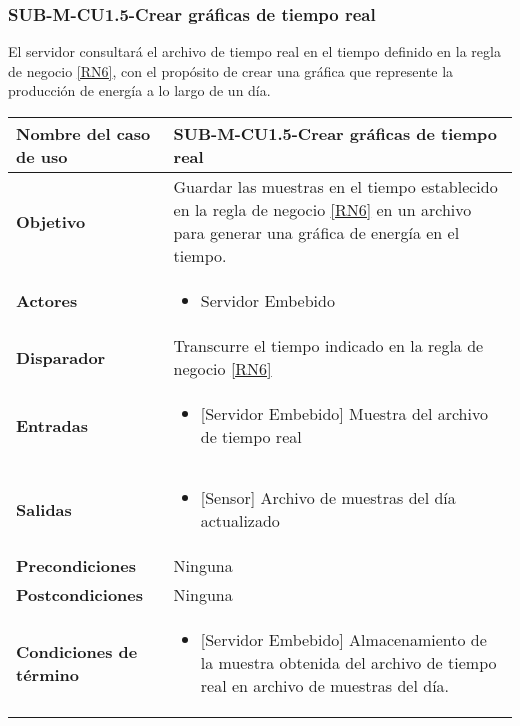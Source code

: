 \subsubsection{SUB-M-CU1.5-Crear gráficas de tiempo real}\label{SUB-M-CU1.5}
El servidor consultará el archivo de tiempo real en el tiempo definido en la regla de negocio \ref{RN6}, con el propósito de crear una gráfica que represente la producción de energía a lo largo de un día.
\begin{longtable}{|J{5cm}|J{10.3cm}|}
	\hline
	\textbf{Nombre del caso de uso} &
		SUB-M-CU1.5-Crear gráficas de tiempo real \\ \hline
	\textbf{Objetivo} &
		Guardar las muestras en el tiempo establecido en la regla de negocio \ref{RN6} en un archivo para generar una gráfica de energía en el tiempo. \\ \hline
	\textbf{Actores} &
	    \begin{itemize}
		    \item Servidor Embebido
		\end{itemize}\\ \hline 
	\textbf{Disparador} & 
		Transcurre el tiempo indicado en la regla de negocio \ref{RN6} \\ \hline 
	\textbf{Entradas} & 
		\begin{itemize}
				\item {[Servidor Embebido]} Muestra del archivo de tiempo real
		\end{itemize}\\ \hline 
	\textbf{Salidas} & 
	    \begin{itemize}
	        \item {[Sensor]} Archivo de muestras del día actualizado
	    \end{itemize}\\ \hline
	\textbf{Precondiciones} & 
		Ninguna \\ \hline
	\textbf{Postcondiciones} &
		Ninguna \\ \hline
	\textbf{Condiciones de término} & 
		\begin{itemize}
		    \item {[Servidor Embebido]} Almacenamiento de la muestra obtenida del archivo de tiempo real en archivo de muestras del día.
		\end{itemize} 
		\\ \hline 

\end{longtable}
